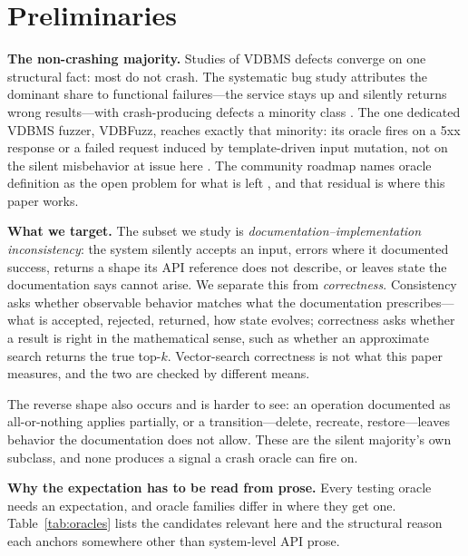 \documentclass[acmsmall,screen,review,anonymous]{acmart}
\begin{document}
\section{Preliminaries}
\label{sec:prelim}

\textbf{The non-crashing majority.} Studies of VDBMS defects converge on one structural fact: most
do not crash. The systematic bug study attributes the dominant share to functional failures---the
service stays up and silently returns wrong results---with crash-producing defects a minority class
\cite{bugstudy25,roadmap25}. The one dedicated VDBMS fuzzer, VDBFuzz, reaches exactly that minority:
its oracle fires on a 5xx response or a failed request induced by template-driven input mutation,
not on the silent misbehavior at issue here \cite{vdbfuzz26}. The community roadmap names oracle
definition as the open problem for what is left \cite{roadmap25}, and that residual is where this
paper works.

\textbf{What we target.} The subset we study is \emph{documentation--implementation inconsistency}:
the system silently accepts an input, errors where it documented success, returns a shape its API
reference does not describe, or leaves state the documentation says cannot arise. We separate this
from \emph{correctness}. Consistency asks whether observable behavior matches what the documentation
prescribes---what is accepted, rejected, returned, how state evolves; correctness asks whether a
result is right in the mathematical sense, such as whether an approximate search returns the true
top-$k$. Vector-search correctness is not what this paper measures, and the two are checked by
different means.

The reverse shape also occurs and is harder to see: an operation documented as all-or-nothing applies
partially, or a transition---delete, recreate, restore---leaves behavior the documentation does not
allow. These are the silent majority's own subclass, and none produces a signal a crash oracle can
fire on.

\textbf{Why the expectation has to be read from prose.} Every testing oracle needs an expectation,
and oracle families differ in where they get one. Table~\ref{tab:oracles} lists the candidates
relevant here and the structural reason each anchors somewhere other than system-level API prose.
\end{document}
